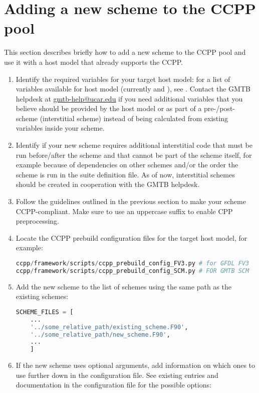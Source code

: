 \section{Adding a new scheme to the CCPP pool}
\label{sec_addscheme}
This section describes briefly how to add a new scheme to the CCPP pool and use it with a host model that already supports the CCPP.
\begin{enumerate}
\item Identify the required variables for your target host model: for a list of variables available for host model  (currently  and ), see . Contact the GMTB helpdesk at \url{gmtb-help@ucar.edu} if you need additional variables that you believe should be provided by the host model or as part of a pre-/post-scheme (interstitial scheme) instead of being calculated from existing variables inside your scheme.
\item Identify if your new scheme requires additional interstitial code that must be run before/after the scheme and that cannot be part of the scheme itself, for example because of dependencies on other schemes and/or the order the scheme is run in the suite definition file. As of now, interstitial schemes should be created in cooperation with the GMTB helpdesk.
\item Follow the guidelines outlined in the previous section to make your scheme CCPP-compliant. Make sure to use an uppercase suffix  to enable CPP preprocessing.
\item Locate the CCPP prebuild configuration files for the target host model, for example:
\begin{lstlisting}[language=Python]
ccpp/framework/scripts/ccpp_prebuild_config_FV3.py # for GFDL FV3
ccpp/framework/scripts/ccpp_prebuild_config_SCM.py # FOR GMTB SCM
\end{lstlisting}
\item Add the new scheme to the list of schemes using the same path as the existing schemes:
\begin{samepage}
\begin{lstlisting}[language=Python]
SCHEME_FILES = [
    ...
    '../some_relative_path/existing_scheme.F90',
    '../some_relative_path/new_scheme.F90',
    ...
    ]
\end{lstlisting}
\end{samepage}
\item If the new scheme uses optional arguments, add information on which ones to use further down in the configuration file. See existing entries and documentation in the configuration file for the possible options:

\end{enumerate}
